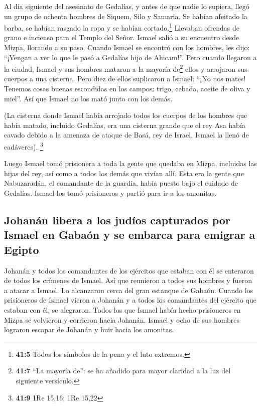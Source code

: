  Al día siguiente del asesinato de Gedalías, y antes de
que nadie lo supiera,  llegó un grupo de ochenta hombres
de Siquem, Silo y Samaria. Se habían afeitado la barba, se habían
rasgado la ropa y se habían cortado.\footnote{\textbf{41:5} Todos los
  símbolos de la pena y el luto extremos.} Llevaban ofrendas de grano e
incienso para el Templo del Señor.  Ismael salió a su
encuentro desde Mizpa, llorando a su paso. Cuando Ismael se encontró con
los hombres, les dijo: ``¡Vengan a ver lo que le pasó a Gedalías hijo de
Ahicam!''.  Pero cuando llegaron a la ciudad, Ismael y sus
hombres mataron a la mayoría de\footnote{\textbf{41:7} ``La mayoría
  de'': se ha añadido para mayor claridad a la luz del siguiente
  versículo.} ellos y arrojaron sus cuerpos a una cisterna.
 Pero diez de ellos suplicaron a Ismael: ``¡No nos mates!
Tenemos cosas buenas escondidas en los campos: trigo, cebada, aceite de
oliva y miel''. Así que Ismael no los mató junto con los demás.

 (La cisterna donde Ismael había arrojado todos los
cuerpos de los hombres que había matado, incluido Gedalías, era una
cisterna grande que el rey Asa había cavado debido a la amenaza de
ataque de Basá, rey de Israel. Ismael la llenó de cadáveres).
\footnote{\textbf{41:9} 1Re 15,16; 1Re 15,22}

 Luego Ismael tomó prisionera a toda la gente que quedaba
en Mizpa, incluidas las hijas del rey, así como a todos los demás que
vivían allí. Esta era la gente que Nabuzaradán, el comandante de la
guardia, había puesto bajo el cuidado de Gedalías. Ismael los tomó
prisioneros y partió para ir a los amonitas.

\hypertarget{johanuxe1n-libera-a-los-juduxedos-capturados-por-ismael-en-gabauxf3n-y-se-embarca-para-emigrar-a-egipto}{%
\subsection{Johanán libera a los judíos capturados por Ismael en Gabaón
y se embarca para emigrar a
Egipto}\label{johanuxe1n-libera-a-los-juduxedos-capturados-por-ismael-en-gabauxf3n-y-se-embarca-para-emigrar-a-egipto}}

 Johanán y todos los comandantes de los ejércitos que
estaban con él se enteraron de todos los crímenes de Ismael.
 Así que reunieron a todos sus hombres y fueron a atacar
a Ismael. Lo alcanzaron cerca del gran estanque de Gabaón.
 Cuando los prisioneros de Ismael vieron a Johanán y a
todos los comandantes del ejército que estaban con él, se alegraron.
 Todos los que Ismael había hecho prisioneros en Mizpa se
volvieron y corrieron hacia Johanán.  Ismael y ocho de
sus hombres lograron escapar de Johanán y huir hacia los amonitas.

